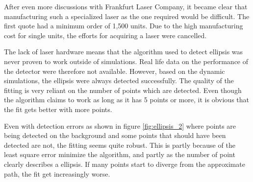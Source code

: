 After even more discussions with Frankfurt Laser Company, it became clear that manufacturing such a specialized laser as the one 
required would be difficult. The first quote had a minimum order of 1,500 units. Due to the high manufacturing cost for single 
units, the efforts for acquiring a laser were cancelled.

The lack of laser hardware means that the algorithm used to detect ellipsis was never proven to work outside of simulations. Real life 
data on the performance of the detector were therefore not available. However, based on the dynamic simulations, the ellipsis were always 
detected successfully. The quality of the fitting is very reliant on the number of points which are detected. Even though the 
algorithm claims to work as long as it has 5 points or more, it is obvious that the fit gets better with more points.

Even with detection errors as shown in figure \vref{fig:ellipsis_2} where points are being detected on the background and some points that should 
have been detected are not, the fitting seems quite robust. This is partly because of the least square error minimize the \citet{fitzgibbon95} algorithm, 
and partly as the number of point clearly describes a ellipsis. If many points start to diverge from the approximate path, the fit get increasingly worse.

